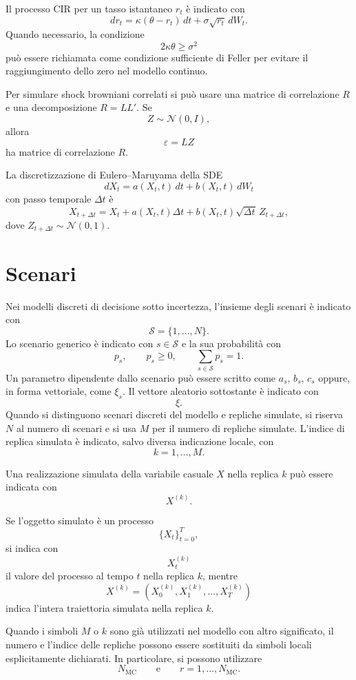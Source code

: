 \documentclass[12pt,a4paper]{article}
\newcommand{\1}{\mathbf{1}}
\begin{document}
Il processo CIR per un tasso istantaneo $r_t$ \`e indicato con
\[
 dr_t=\kappa(\theta-r_t)\,dt+\sigma\sqrt{r_t}\,dW_t.
\]
Quando necessario, la condizione
\[
 2\kappa\theta\geq \sigma^2
\]
pu\`o essere richiamata come condizione sufficiente di Feller per evitare il
raggiungimento dello zero nel modello continuo.

Per simulare shock browniani correlati si pu\`o usare una matrice di
correlazione $R$ e una decomposizione $R=LL'$. Se
\[
 Z\sim\mathcal{N}(0,I),
\]
allora
\[
 \varepsilon=LZ
\]
ha matrice di correlazione $R$.

La discretizzazione di Eulero--Maruyama della SDE
\[
 dX_t=a(X_t,t)\,dt+b(X_t,t)\,dW_t
\]
con passo temporale $\Delta t$ \`e
\[
 X_{t+\Delta t}=X_t+a(X_t,t)\Delta t+b(X_t,t)\sqrt{\Delta t}\,Z_{t+\Delta t},
\]
dove $Z_{t+\Delta t}\sim\mathcal{N}(0,1)$.

\section{Scenari}

Nei modelli discreti di decisione sotto incertezza, l'insieme degli scenari \`e
indicato con
\[
 \mathcal{S}=\{1,\ldots,N\}.
\]
Lo scenario generico \`e indicato con $s\in\mathcal{S}$ e la sua
probabilit\`a con
\[
 p_s,
 \qquad p_s\geq 0,
 \qquad \sum_{s\in\mathcal{S}}p_s=1.
\]
Un parametro dipendente dallo scenario pu\`o essere scritto come $a_s$,
$b_s$, $c_s$ oppure, in forma vettoriale, come $\xi_s$. Il vettore aleatorio
sottostante \`e indicato con
\[
 \xi.
\]
Quando si distinguono scenari discreti del modello e repliche simulate, si
riserva $N$ al numero di scenari e si usa $M$ per il numero di repliche
simulate. L'indice di replica simulata \`e indicato, salvo diversa
indicazione locale, con
\[
k=1,\ldots,M.
\]

Una realizzazione simulata della variabile casuale $X$ nella replica $k$
pu\`o essere indicata con
\[
X^{(k)}.
\]

Se l'oggetto simulato \`e un processo
\[
\{X_t\}_{t=0}^{T},
\]
si indica con
\[
X_t^{(k)}
\]
il valore del processo al tempo $t$ nella replica $k$, mentre
\[
X^{(k)}
=
\left(
X_0^{(k)},X_1^{(k)},\ldots,X_T^{(k)}
\right)
\]
indica l'intera traiettoria simulata nella replica $k$.

Quando i simboli $M$ o $k$ sono gi\`a utilizzati nel modello con altro
significato, il numero e l'indice delle repliche possono essere sostituiti
da simboli locali esplicitamente dichiarati. In particolare, si possono
utilizzare
\[
N_{\mathrm{MC}}
\qquad\text{e}\qquad
r=1,\ldots,N_{\mathrm{MC}}.
\]
\end{document}
